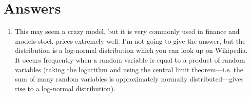 \documentclass[11pt]{article}
\begin{document}
\section{Answers}
\label{sec:org9647c37}
\begin{enumerate}
\item This may seem a crazy model, but it is very commonly used in
finance and models stock prices extremely well.  I'm not going to
give the answer, but the distribution is a log-normal
distribution which you can look up on Wikipedia.  It occurs
frequently when a random variable is equal to a product of random
variables (taking the logarithm and using the central limit
theorem---i.e. the sum of many random variables is approximately
normally distributed---gives rise to a log-normal distribution).
\end{enumerate}
\end{document}
